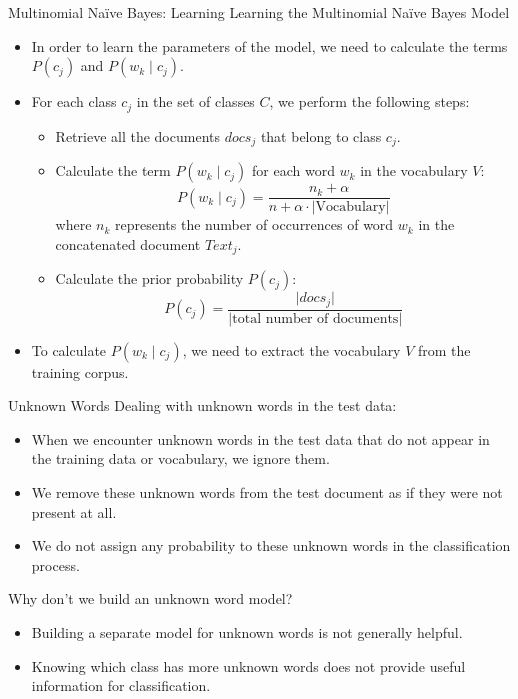 \documentclass[handout]{beamer}
\begin{document}
\begin{frame}{Multinomial Naïve Bayes: Learning}
\scriptsize
Learning the Multinomial Naïve Bayes Model
\begin{itemize}
    \item In order to learn the parameters of the model, we need to calculate the terms $P(c_j)$ and $P(w_k \mid c_j)$.
    \item For each class $c_j$ in the set of classes $C$, we perform the following steps:
    \begin{itemize}
        \item Retrieve all the documents $docs_j$ that belong to class $c_j$.
        \item Calculate the term $P(w_k \mid c_j)$ for each word $w_k$ in the vocabulary $V$:
        \[
        P(w_k \mid c_j) = \frac{{n_k + \alpha}}{{n + \alpha \cdot \lvert \text{Vocabulary} \rvert}}
        \]
        where $n_k$ represents the number of occurrences of word $w_k$ in the concatenated document $Text_j$.
        \item Calculate the prior probability $P(c_j)$:
        \[
        P(c_j) = \frac{{\lvert docs_j \rvert}}{{\lvert \text{total number of documents} \rvert}}
        \]
    \end{itemize}
    \item To calculate $P(w_k \mid c_j)$, we need to extract the vocabulary $V$ from the training corpus.
\end{itemize}
\end{frame}

\begin{frame}{Unknown Words}
\scriptsize
Dealing with unknown words in the test data:
\begin{itemize}
    \item When we encounter unknown words in the test data that do not appear in the training data or vocabulary, we ignore them.
    \item We remove these unknown words from the test document as if they were not present at all.
    \item We do not assign any probability to these unknown words in the classification process.
\end{itemize}

Why don't we build an unknown word model?
\begin{itemize}
    \item Building a separate model for unknown words is not generally helpful.
    \item Knowing which class has more unknown words does not provide useful information for classification.
\end{itemize}
\end{frame}
\end{document}
